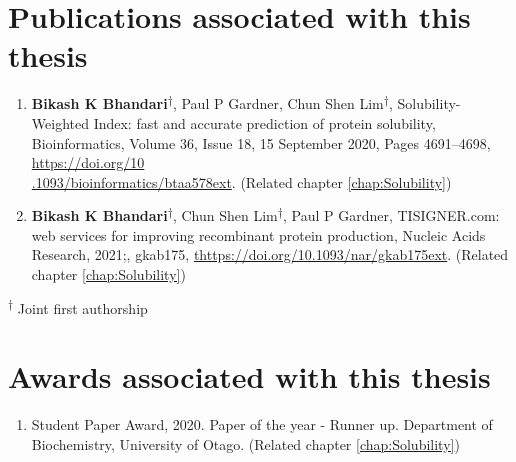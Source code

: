 \section*{Publications associated with this thesis}
\begin{enumerate}
	\item \textbf{Bikash K Bhandari}\textsuperscript{$\dagger$}, Paul P Gardner, Chun Shen Lim\textsuperscript{$\dagger$}, Solubility-Weighted Index: fast and accurate prediction of protein solubility, Bioinformatics, Volume 36, Issue 18, 15 September 2020, Pages 4691–4698, \href{https://doi.org/10.1093/bioinformatics/btaa578}{https://doi.org/10\\.1093/bioinformatics/btaa578ext}. (Related chapter \ref{chap:Solubility})
	
	
	\item \textbf{Bikash K Bhandari}\textsuperscript{$\dagger$}, Chun Shen Lim\textsuperscript{$\dagger$}, Paul P Gardner, TISIGNER.com: web services for improving recombinant protein production, Nucleic Acids Research, 2021;, gkab175, \href{https://doi.org/10.1093/nar/gkab175}{thttps://doi.org/10.1093/nar/gkab175ext}. (Related chapter \ref{chap:Solubility})
	
\end{enumerate}

\textsuperscript{$\dagger$} Joint first authorship



\section*{Awards associated with this thesis}
\begin{enumerate}
	\item Student Paper Award, 2020. Paper of the year - Runner up. Department of Biochemistry, University of Otago. (Related chapter \ref{chap:Solubility})

\end{enumerate}